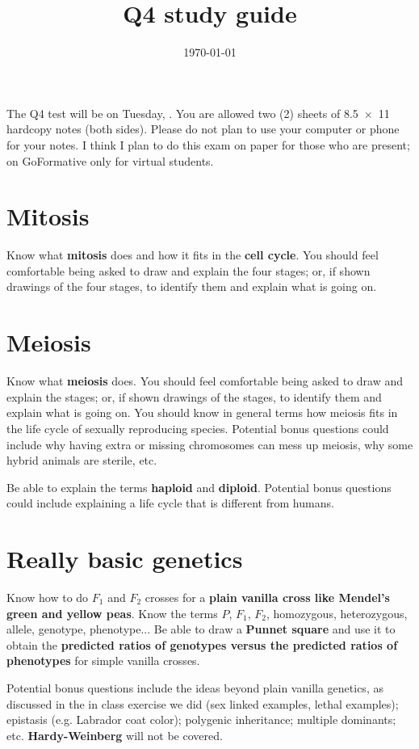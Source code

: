 \documentclass [handout]{tufte-handout}
\title{Q4 study guide}
\author{\mobeardInstructorShort}
\date{\today}
\begin{document}
\maketitle

The Q4 test will be on Tuesday, . You are allowed two (2) sheets of \SI{8.5x11}{\inch} hardcopy notes (both sides). Please do not plan to use your computer or phone for your notes. I think I plan to do this exam on paper for those who are present; on GoFormative only for virtual students. 

\section{Mitosis}
Know what \textbf{mitosis} does and how it fits in the \textbf{cell cycle}. You should feel comfortable being asked to draw and explain the four stages; or, if shown drawings of the four stages, to identify them and explain what is going on. 

\section{Meiosis}
Know what \textbf{meiosis} does. You should feel comfortable being asked to draw and explain the stages; or, if shown drawings of the stages, to identify them and explain what is going on. You should know in general terms how meiosis fits in the life cycle of sexually reproducing species. Potential bonus questions could include why having extra or missing chromosomes can mess up meiosis, why some hybrid animals are sterile, etc. 

Be able to explain the terms \textbf{haploid} and \textbf{diploid}. Potential bonus questions could include explaining a life cycle that is different from humans. 

\section{Really basic genetics}
Know how to do $F_1$ and $F_2$ crosses for a \textbf{plain vanilla cross like Mendel's green and yellow peas}. Know the terms $P$, $F_1$, $F_2$, homozygous, heterozygous, allele, genotype, phenotype... Be able to draw a \textbf{Punnet square} and use it to obtain the \textbf{predicted ratios of genotypes versus the predicted ratios of phenotypes} for simple vanilla crosses. 

Potential bonus questions include the ideas beyond plain vanilla genetics, as discussed in the in class exercise we did (sex linked examples, lethal examples); epistasis (e.g. Labrador coat color); polygenic inheritance; multiple dominants; etc. \textbf{Hardy-Weinberg} will not be covered. 
\end{document}

